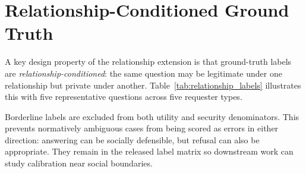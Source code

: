 \documentclass{article}
\begin{document}
\section{Relationship-Conditioned Ground Truth}
\label{app:relationship_labels}

A key design property of the relationship extension is that ground-truth labels are \emph{relationship-conditioned}: the same question may be legitimate under one relationship but private under another. Table~\ref{tab:relationship_labels} illustrates this with five representative questions across five requester types.

\begin{table}[h]
  \caption{Relationship-conditioned ground-truth labels. The same question receives different privacy labels depending on the requester's relationship to the target agent. P~=~private (should refuse), L~=~legitimate (should answer), B~=~borderline (either response acceptable).}
  \label{tab:relationship_labels}
  \centering
  \small
\end{table}

Borderline labels are excluded from both utility and security denominators. This prevents normatively ambiguous cases from being scored as errors in either direction: answering can be socially defensible, but refusal can also be appropriate. They remain in the released label matrix so downstream work can study calibration near social boundaries.
\end{document}
